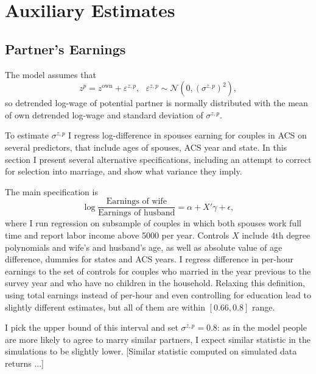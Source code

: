 \section{Auxiliary Estimates}
\subsection{Partner's Earnings\label{partearn}}
The model assumes that
\[ z^p = z^{\text{own}} + \varepsilon^{z,p}, \ \ \ \varepsilon^{z,p}\sim\mathcal{N}(0,(\sigma^{z,p})^2),\]
so detrended log-wage of potential partner is normally distributed with the mean of own detrended log-wage and standard deviation of $\sigma^{z,p}$.

To estimate $\sigma^{z,p}$ I regress log-difference in spouses earning for couples in ACS on several predictors, that include ages of spouses, ACS year and state. In this section I present several alternative specifications, including an attempt to correct for selection into marriage, and show what variance they imply. 

The main specification is
\[\log \frac{\text{Earnings of wife}}{\text{Earnings of husband}} = \alpha + X'\gamma + \epsilon,\]
where I run regression on subsample of couples in which both spouses work full time and report labor income above 5000 per year.  Controls $X$ include 4th degree polynomials and wife's and husband's age, as well as absolute value of age difference, dummies for states and ACS years. I regress difference in per-hour earnings to the set of controls for couples who married in the year previous to the survey year and who have no children in the household. Relaxing this definition, using total earnings instead of per-hour and even controlling for education lead to slightly different estimates, but all of them are within $[0.66,0.8]$ range.

I pick the upper bound of this interval and set $\sigma^{z,p} = 0.8$: as in the model people are more likely to agree to marry similar partners, I expect similar statistic in the simulations to be slightly lower. [Similar statistic computed on simulated data returns ...]

